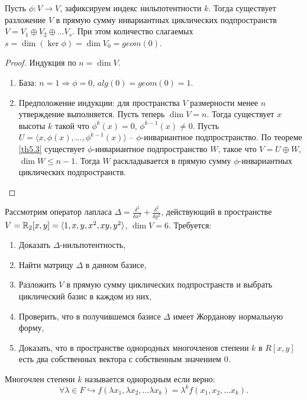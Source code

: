 \begin{theorem}
    Пусть $\phi: V \to V$, зафиксируем индекс нильпотентности $k$. Тогда существует разложение $V$ 
    в прямую сумму инвариантных циклических подпространств $V = V_1 \oplus V_2 \oplus \dots V_s$. 
    При этом количество слагаемых $s = \dim (\ker \phi) = \dim V_0 = geom(0)$.
\end{theorem}

\begin{proof}
    Индукция по $n = \dim V$. 
    \begin{enumerate}
        \item База: $n = 1 \Rightarrow \phi = 0$, $alg(0) = geom(0) = 1$.
        \item Предположение индукции: для пространства $V$ размерности менее $n$ утверждение выполняется. 
        Пусть теперь $\dim V = n$. 
        Тогда существует $x$ высоты $k$ такой что $\phi^k(x) = 0$, $\phi^{k-1}(x) \neq 0$. 
        Пусть $U = \langle x, \phi(x), \dots, \phi^{k-1}(x) \rangle$ -- $\phi$-инвариантное подпространство.
        По теореме \ref{th5.3} существует $\phi$-инвариантное подпространство $W$, такое что  
        $V = U \oplus W$, $\dim W \leq n-1$. Тогда $W$ раскладывается в прямую сумму 
        $\phi$-инвариантных циклических подпространств.
    \end{enumerate}
\end{proof}

\begin{problem}
    Рассмотрим оператор лапласа $\Delta = \frac{\delta^2}{\delta x^2} + \frac{\delta^2}{\delta y^2}$,
    действующий в пространстве $V = \mathbb{R}_2[x, y] = \langle 1, x, y, x^2, xy, y^2 \rangle$, $\dim V = 6$. Требуется:
    \begin{enumerate}
        \item Доказать $\Delta$-нильпотентность,
        \item Найти матрицу $\Delta$ в данном базисе,
        \item Разложить $V$ в прямую сумму циклических подпространств и выбрать циклический базис 
              в каждом из них,
        \item Проверить, что в получившемся базисе $\Delta$ имеет Жорданову нормальную форму,
        \item Доказать, что в пространстве однородных многочленов степени $k$ в $R[x,y]$ есть два 
              собственных вектора с собственным значением 0.
    \end{enumerate}
\end{problem}

\begin{reminder}
    Многочлен степени $k$ называется однородным если верно: 
    $$\forall \lambda \in F \hookrightarrow f(\lambda x_1, \lambda x_2, \dots \lambda x_k) 
    = \lambda^k f(x_1, x_2, \dots x_k).$$
\end{reminder}
